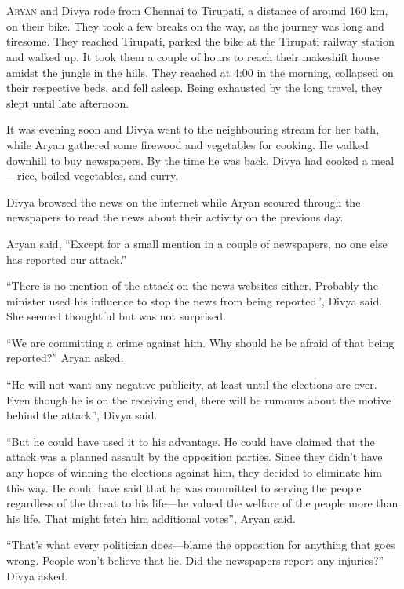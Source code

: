 \chapter{}
\lettrine{A}{ryan} and Divya rode from Chennai to Tirupati, a distance of around
160 km, on their bike.  They took a few breaks on the way, as the journey was
long and tiresome. They reached Tirupati, parked the bike at the Tirupati
railway station and walked up.  It took them a couple of hours to reach their
makeshift house amidst the jungle in the hills. They reached at 4:00 in the
morning, collapsed on their respective beds, and fell asleep. Being exhausted by
the long travel, they slept until late afternoon.

It was evening soon and Divya went to the neighbouring stream for her bath, while Aryan
gathered some firewood and vegetables for cooking. He walked downhill to buy
newspapers. By the time he was back, Divya had cooked a meal—rice, boiled
vegetables, and curry.

Divya browsed the news on the internet while Aryan scoured through the newspapers to read
the news about their activity on the previous day.

Aryan said, “Except for a small mention in a couple of newspapers, no one else
has reported our attack.”

“There is no mention of the attack on the news websites either. Probably the
minister used his influence to stop the news from being reported”, Divya said.
She seemed thoughtful but was not surprised.

“We are committing a crime against him. Why should he be afraid of that being
reported?” Aryan asked.

“He will not want any negative publicity, at least until the elections are over.
Even though he is on the receiving end, there will be rumours about the motive
behind the attack”, Divya said.

“But he could have used it to his advantage. He could have claimed that the
attack was a planned assault by the opposition parties. Since they didn't have
any hopes of winning the elections against him, they decided to eliminate him
this way. He could have said that he was committed to serving the people
regardless of the threat to his life—he valued the welfare of the people more
than his life. That might fetch him additional votes”, Aryan said.

“That's what every politician does—blame the opposition for anything that goes
wrong. People won't believe that lie. Did the newspapers report any injuries?”
Divya asked.

